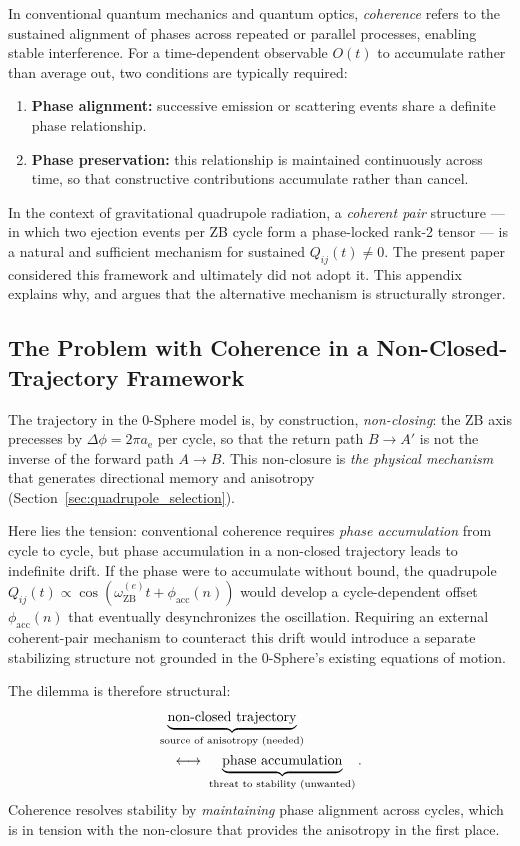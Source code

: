 \documentclass[%
 reprint, amsmath,amssymb, aps, prd, ]{revtex4-2}
\numberwithin{equation}{section}
\newcommand{\anom}{a_{\mathrm{e}}}
\newcommand{\omZBe}{\omega_{\mathrm{ZB}}^{(e)}}
\begin{document}
In conventional quantum mechanics and quantum optics, \emph{coherence} refers to the sustained alignment of phases across repeated or parallel processes, enabling stable interference.
For a time-dependent observable $O(t)$ to accumulate rather than average out, two conditions are typically required:
\begin{enumerate}[label=(\roman*), leftmargin=2em, itemsep=2pt]
\item \textbf{Phase alignment:} successive emission or scattering events share a definite phase relationship.
\item \textbf{Phase preservation:} this relationship is maintained continuously across time, so that constructive contributions accumulate rather than cancel.
\end{enumerate}
In the context of gravitational quadrupole radiation, a \emph{coherent pair} structure --- in which two ejection events per ZB cycle form a phase-locked rank-2 tensor --- is a natural and sufficient mechanism for sustained $Q_{ij}(t) \neq 0$.
The present paper considered this framework and ultimately did not adopt it.
This appendix explains why, and argues that the alternative mechanism is structurally stronger.

\subsection{The Problem with Coherence in a Non-Closed-Trajectory Framework}

The trajectory in the 0-Sphere model is, by construction, \emph{non-closing}: the ZB axis precesses by $\Delta\phi = 2\pi\anom$ per cycle, so that the return path $B \to A'$ is not the inverse of the forward path $A \to B$.
This non-closure is \emph{the physical mechanism} that generates directional memory and anisotropy (Section~\ref{sec:quadrupole_selection}).

Here lies the tension: conventional coherence requires \emph{phase accumulation} from cycle to cycle, but phase accumulation in a non-closed trajectory leads to indefinite drift.
If the phase were to accumulate without bound, the quadrupole $Q_{ij}(t) \propto \cos(\omZBe t + \phi_\mathrm{acc}(n))$ would develop a cycle-dependent offset $\phi_\mathrm{acc}(n)$ that eventually desynchronizes the oscillation.
Requiring an external coherent-pair mechanism to counteract this drift would introduce a separate stabilizing structure not grounded in the 0-Sphere's existing equations of motion.

The dilemma is therefore structural:
\begin{align}
&\underbrace{\text{non-closed trajectory}}_{\text{source of anisotropy (needed)}}
\notag\\
&\quad\longleftrightarrow\;
\underbrace{\text{phase accumulation}}_{\text{threat to stability (unwanted)}}.
\label{eq:dilemma}
\end{align}
Coherence resolves stability by \emph{maintaining} phase alignment across cycles, which is in tension with the non-closure that provides the anisotropy in the first place.
\end{document}
